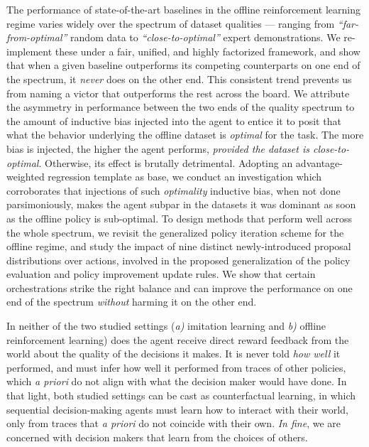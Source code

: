 The performance of state-of-the-art baselines in the offline reinforcement learning regime varies widely over the
spectrum of dataset qualities --- ranging from \textit{``far-from-optimal''} random data
to \textit{``close-to-optimal''} expert demonstrations.
We re-implement these under a fair, unified, and highly factorized framework,
and show that when a given baseline outperforms its competing counterparts
on one end of the spectrum, it \emph{never} does on the other end.
This consistent trend prevents us from naming a victor that outperforms the rest across the board.
We attribute the asymmetry in performance between the two ends of the quality spectrum to
the amount of inductive bias injected into the agent to entice it to posit that what the behavior underlying
the offline dataset is \emph{optimal} for the task.
The more bias is injected, the higher the agent performs, \emph{provided the dataset is close-to-optimal}.
Otherwise, its effect is brutally detrimental.
Adopting an advantage-weighted regression template as base, we conduct an investigation which corroborates that
injections of such \emph{optimality} inductive bias, when not done parsimoniously,
makes the agent subpar in the datasets it was dominant as soon as the offline policy is sub-optimal.
To design methods that perform well across the whole spectrum,
we revisit the generalized policy iteration scheme for the offline regime, and study the impact of nine distinct
newly-introduced proposal distributions over actions, involved in the proposed generalization of the
policy evaluation and policy improvement update rules.
We show that certain orchestrations strike the right balance and can improve the performance on one end of the spectrum
\emph{without} harming it on the other end.

In neither of the two studied settings
(\textit{a)} imitation learning and \textit{b)} offline reinforcement learning)
does the agent receive direct reward feedback from the world
about the quality of the decisions it makes.
It is never told \emph{how well} it performed, and must infer how well it performed from
traces of other policies, which \textit{a priori} do not align with what the decision maker would have done.
In that light, both studied settings
can be cast as counterfactual learning,
in which sequential decision-making agents must learn how to interact with their world,
only from traces that \textit{a priori} do not coincide with their own.
\textit{In fine}, we are concerned with decision makers that learn from the choices of others.
